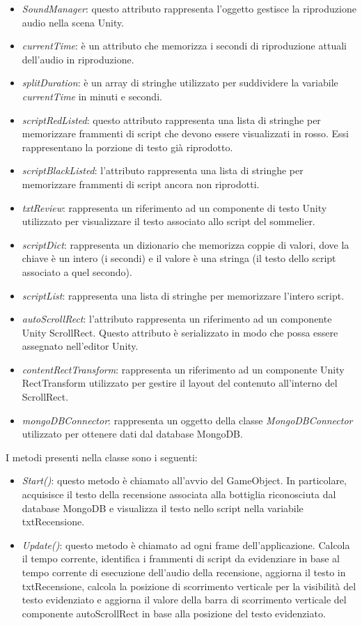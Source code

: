 \begin{itemize}
    \item \textit{SoundManager}: questo attributo rappresenta l'oggetto gestisce la riproduzione audio nella scena Unity.
    \item \textit{currentTime}: è un attributo che memorizza i secondi di riproduzione attuali dell'audio in riproduzione. 
    \item \textit{splitDuration}: è un array di stringhe utilizzato per suddividere la variabile \textit{currentTime} in minuti e secondi.
    \item \textit{scriptRedListed}: questo attributo rappresenta una lista di stringhe per memorizzare frammenti di script che devono essere visualizzati in rosso. Essi rappresentano la porzione di testo già riprodotto.
    \item \textit{scriptBlackListed}: l'attributo rappresenta una lista di stringhe per memorizzare frammenti di script ancora non riprodotti.
    \item \textit{txtReview}: rappresenta un riferimento ad un componente di testo Unity utilizzato per visualizzare il testo associato allo script del sommelier.
    \item \textit{scriptDict}: rappresenta un dizionario che memorizza coppie di valori, dove la chiave è un intero (i secondi) e il valore è una stringa (il testo dello script associato a quel secondo).
    \item \textit{scriptList}: rappresenta una lista di stringhe per memorizzare l'intero script.
    \item \textit{autoScrollRect}: l'attributo rappresenta un riferimento ad un componente Unity ScrollRect. Questo attributo è serializzato in modo che possa essere assegnato nell'editor Unity. 
    \item \textit{contentRectTransform}: rappresenta un riferimento ad un componente Unity RectTransform utilizzato per gestire il layout del contenuto all'interno del ScrollRect.
    \item \textit{mongoDBConnector}: rappresenta un oggetto della classe \textit{MongoDBConnector} utilizzato per ottenere dati dal database MongoDB.
\end{itemize}

I metodi presenti nella classe sono i seguenti:

\begin{itemize}
    \item \textit{Start()}: questo metodo è chiamato all'avvio del GameObject. In particolare, acquisisce il testo della recensione associata alla bottiglia riconosciuta dal database MongoDB e visualizza il testo nello script nella variabile txtRecensione.
    \item \textit{Update()}: questo metodo è chiamato ad ogni frame dell'applicazione. Calcola il tempo corrente, identifica i frammenti di script da evidenziare in base al tempo corrente di esecuzione dell'audio della recensione, aggiorna il testo in txtRecensione, calcola la posizione di scorrimento verticale per la visibilità del testo evidenziato e aggiorna il valore della barra di scorrimento verticale del componente autoScrollRect in base alla posizione del testo evidenziato.
\end{itemize}

